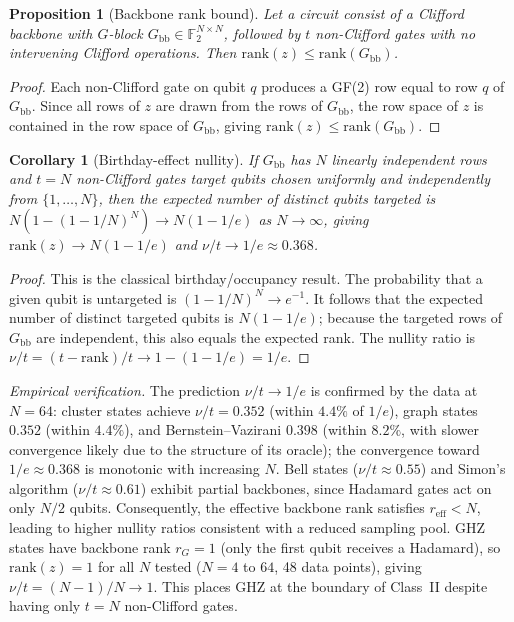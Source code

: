 \documentclass[a4paper,twocolumn,11pt]{quantumarticle}
\newtheorem{proposition}[theorem]{Proposition}
\newtheorem{corollary}[theorem]{Corollary}
\begin{document}
\begin{proposition}[Backbone rank bound]
\label{prop:backbone_bound}
Let a circuit consist of a Clifford backbone with $G$-block $G_{\mathrm{bb}} \in \mathbb{F}_2^{N \times N}$, followed by $t$ non-Clifford gates with no intervening Clifford operations.
Then $\mathrm{rank}(z) \le \mathrm{rank}(G_{\mathrm{bb}})$.
\end{proposition}

\begin{proof}
Each non-Clifford gate on qubit $q$ produces a GF(2) row equal to row $q$ of $G_{\mathrm{bb}}$.
Since all rows of $z$ are drawn from the rows of $G_{\mathrm{bb}}$, the row space of $z$ is contained in the row space of $G_{\mathrm{bb}}$, giving $\mathrm{rank}(z) \le \mathrm{rank}(G_{\mathrm{bb}})$.
\end{proof}

\begin{corollary}[Birthday-effect nullity]
\label{cor:birthday}
If $G_{\mathrm{bb}}$ has $N$ linearly independent rows and $t = N$ non-Clifford gates target qubits chosen uniformly and independently from $\{1, \ldots, N\}$, then the expected number of distinct qubits targeted is $N(1 - (1 - 1/N)^N) \to N(1 - 1/e)$ as $N \to \infty$, giving $\mathrm{rank}(z) \to N(1 - 1/e)$ and $\nu/t \to 1/e \approx 0.368$.
\end{corollary}

\begin{proof}
This is the classical birthday/occupancy result.
The probability that a given qubit is untargeted is $(1 - 1/N)^N \to e^{-1}$. It follows that the expected number of distinct targeted qubits is $N(1 - 1/e)$; because the targeted rows of $G_{\mathrm{bb}}$ are independent, this also equals the expected rank.
The nullity ratio is $\nu/t = (t - \mathrm{rank})/t \to 1 - (1 - 1/e) = 1/e$.
\end{proof}

\emph{Empirical verification.}
The prediction $\nu/t \to 1/e$ is confirmed by the data at $N = 64$:
cluster states achieve $\nu/t = 0.352$ (within $4.4\%$ of $1/e$), graph states $0.352$ (within $4.4\%$), and Bernstein--Vazirani $0.398$ (within $8.2\%$, with slower convergence likely due to the structure of its oracle); the convergence toward $1/e \approx 0.368$ is monotonic with increasing $N$.
Bell states ($\nu/t \approx 0.55$) and Simon's algorithm ($\nu/t \approx 0.61$) exhibit partial backbones, since Hadamard gates act on only $N/2$ qubits. Consequently, the effective backbone rank satisfies $r_{\mathrm{eff}} < N$, leading to higher nullity ratios consistent with a reduced sampling pool.
GHZ states have backbone rank $r_G = 1$ (only the first qubit receives a Hadamard), so $\mathrm{rank}(z) = 1$ for all $N$ tested ($N = 4$ to $64$, 48 data points), giving $\nu/t = (N - 1)/N \to 1$.
This places GHZ at the boundary of Class~II despite having only $t = N$ non-Clifford gates.
\end{document}
